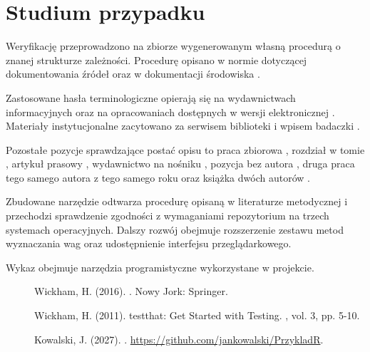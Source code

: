 \documentclass[stronyinfo]{epi-praca}
\begin{document}
\chapter{Studium przypadku}

Weryfikację przeprowadzono na zbiorze wygenerowanym własną procedurą o znanej strukturze zależności. Procedurę opisano w normie dotyczącej dokumentowania źródeł \parencite{pniso690} oraz w dokumentacji środowiska \parencite{rcore2026}.

Zastosowane hasła terminologiczne opierają się na wydawnictwach informacyjnych \parencite{apoteoza1996,kolodziejska1976propaganda} oraz na opracowaniach dostępnych w wersji elektronicznej \parencite{cisek2002szara,kowalski2009zmiany}. Materiały instytucjonalne zacytowano za serwisem biblioteki \parencite{bj2021zasoby} i wpisem badaczki \parencite{cisek2019informacja}.

Pozostałe pozycje sprawdzające postać opisu to praca zbiorowa \parencite{zielinski1998swiat}, rozdział w tomie \parencite{nowak2004srodowisko}, artykuł prasowy \parencite{nowak2000jutro}, wydawnictwo na nośniku \parencite{kopalinski1998slownik}, pozycja bez autora \parencite{elektroniczne2008}, druga praca tego samego autora z tego samego roku \parencite{kowalski2010b} oraz książka dwóch autorów \parencite{nowak2009postrzeganie}.

\podsumowanie

Zbudowane narzędzie odtwarza procedurę opisaną w literaturze metodycznej i przechodzi sprawdzenie zgodności z wymaganiami repozytorium na trzech systemach operacyjnych. Dalszy rozwój obejmuje rozszerzenie zestawu metod wyznaczania wag oraz udostępnienie interfejsu przeglądarkowego.

\wykazzrodel

Wykaz obejmuje narzędzia programistyczne wykorzystane w projekcie.

\begin{description}
\item[] Wickham, H. (2016). . Nowy Jork: Springer.
\item[] Wickham, H. (2011). testthat: Get Started with Testing. , vol. 3, pp. 5-10.
\item[] Kowalski, J. (2027). . \url{https://github.com/jankowalski/PrzykladR}.
\end{description}
\end{document}
